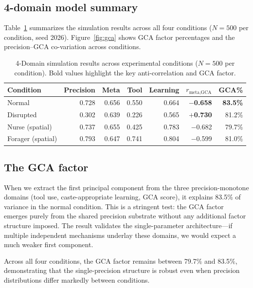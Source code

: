\subsection*{4-domain model summary}
\label{sec:sim:summary}

Table~\ref{tab:results} summarizes the simulation results across all four conditions
($N = 500$ per condition, seed 2026). Figure~\ref{fig:gca} shows GCA factor
percentages and the precision--GCA co-variation across conditions.

\begin{table}[h!]
  \centering
  \caption{4-Domain simulation results across experimental conditions ($N=500$ per condition).
  Bold values highlight the key anti-correlation and GCA factor.}
  \label{tab:results}
  \begin{tabular}{lrrrrrr}
    \hline
    Condition & Precision & Meta & Tool & Learning & $r_{\text{meta,GCA}}$ & GCA\% \\
    \hline
    Normal         & 0.728 & 0.656 & 0.550 & 0.664 & \textbf{$-$0.658} & \textbf{83.5\%} \\
    Disrupted      & 0.302 & 0.639 & 0.226 & 0.565 & \textbf{$+$0.730} & 81.2\% \\
    Nurse (spatial)  & 0.737 & 0.655 & 0.425 & 0.783 & $-$0.682 & 79.7\% \\
    Forager (spatial) & 0.793 & 0.647 & 0.741 & 0.804 & $-$0.599 & 81.0\% \\
    \hline
  \end{tabular}
\end{table}

\subsection*{The GCA factor}
\label{sec:sim:gca}

When we extract the first principal component from the three precision-monotone domains (tool use,
caste-appropriate learning, GCA score), it explains 83.5\% of variance in the normal condition.
This is a stringent test: the GCA factor emerges purely from the shared precision substrate without
any additional factor structure imposed. The result validates the single-parameter architecture---if
multiple independent mechanisms underlay these domains, we would expect a much weaker first
component.

Across all four conditions, the GCA factor remains between 79.7\% and 83.5\%, demonstrating
that the single-precision structure is robust even when precision distributions differ markedly
between conditions.

